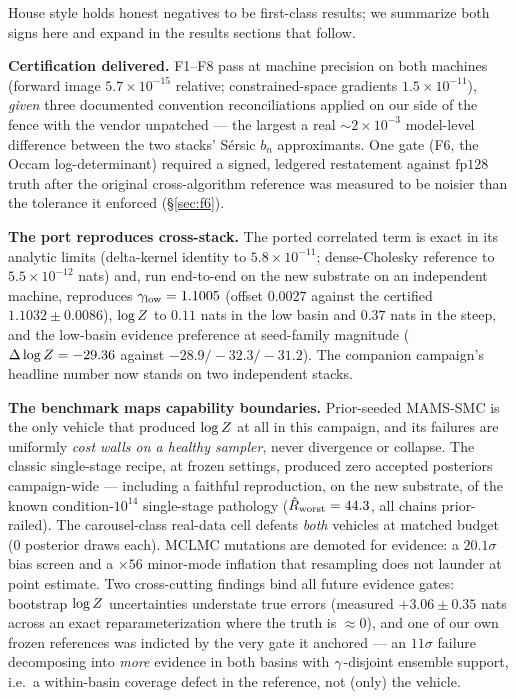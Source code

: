 House style holds honest negatives to be first-class results; we summarize
both signs here and expand in the results sections that follow.

\textbf{Certification delivered.} F1--F8 pass at machine precision on both
machines (forward image $5.7\times10^{-15}$ relative; constrained-space
gradients $1.5\times10^{-11}$), \emph{given} three documented convention
reconciliations applied on our side of the fence with the vendor
unpatched --- the largest a real $\sim$$2\times10^{-3}$ model-level
difference between the two stacks' S\'ersic $b_n$ approximants. One gate
(F6, the Occam log-determinant) required a signed, ledgered restatement
against $\mathrm{fp}128$ truth after the original cross-algorithm
reference was measured to be noisier than the tolerance it enforced
(\S\ref{sec:f6}).

\textbf{The port reproduces cross-stack.} The ported correlated term is
exact in its analytic limits (delta-kernel identity to $5.8\times10^{-11}$;
dense-Cholesky reference to $5.5\times10^{-12}$ nats) and, run end-to-end
on the new substrate on an independent machine, reproduces
$\gamma_{\rm low}=1.1005$ (offset $0.0027$ against the certified
$1.1032\pm0.0086$), $\log Z$ to $0.11$ nats in the low basin and $0.37$
nats in the steep, and the low-basin
evidence preference at seed-family magnitude ($\Delta\log Z=-29.36$ against
$-28.9/-32.3/-31.2$). The companion campaign's headline number now stands
on two independent stacks.

\textbf{The benchmark maps capability boundaries.} Prior-seeded MAMS-SMC
is the only vehicle that produced $\log Z$ at all in this campaign, and its
failures are uniformly \emph{cost walls on a healthy sampler}, never
divergence or collapse. The classic single-stage recipe, at frozen
settings, produced zero accepted posteriors campaign-wide --- including a
faithful reproduction, on the new substrate, of the known
condition-$10^{14}$ single-stage pathology ($\hat{R}_{\rm worst}=44.3$, all
chains prior-railed). The carousel-class real-data cell defeats
\emph{both} vehicles at matched budget (0 posterior draws each). MCLMC
mutations are demoted for evidence: a $20.1\sigma$ bias screen and a
$\times56$ minor-mode inflation that resampling does not launder at point
estimate. Two
cross-cutting findings bind all future evidence gates: bootstrap $\log Z$
uncertainties understate true errors (measured $+3.06\pm0.35$ nats across
an exact reparameterization where the truth is $\approx$0), and one of our
own frozen references was indicted by the very gate it anchored --- an
$11\sigma$ failure decomposing into \emph{more} evidence in both basins
with $\gamma$-disjoint ensemble support, i.e.\ a within-basin coverage
defect in the reference, not (only) the vehicle.

